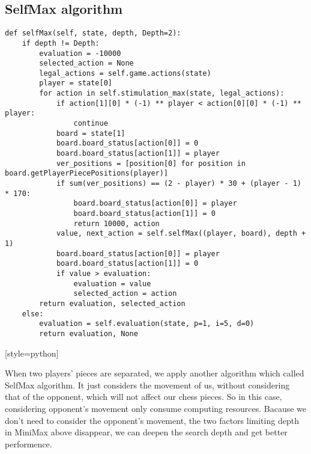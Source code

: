 \documentclass[aps,letterpaper,10pt]{revtex4}
\begin{document}
\subsection{SelfMax algorithm}
\begin{lstlisting}[style=python]
def selfMax(self, state, depth, Depth=2):
	if depth != Depth:
		evaluation = -10000
		selected_action = None
		legal_actions = self.game.actions(state)
		player = state[0]
		for action in self.stimulation_max(state, legal_actions):
			if action[1][0] * (-1) ** player < action[0][0] * (-1) ** player:
				continue
			board = state[1]
			board.board_status[action[0]] = 0
			board.board_status[action[1]] = player
			ver_positions = [position[0] for position in board.getPlayerPiecePositions(player)]
			if sum(ver_positions) == (2 - player) * 30 + (player - 1) * 170:
				board.board_status[action[0]] = player
				board.board_status[action[1]] = 0
				return 10000, action
			value, next_action = self.selfMax((player, board), depth + 1)
			board.board_status[action[0]] = player
			board.board_status[action[1]] = 0
			if value > evaluation:
				evaluation = value
				selected_action = action
		return evaluation, selected_action
	else:
		evaluation = self.evaluation(state, p=1, i=5, d=0)
		return evaluation, None
\end{lstlisting}[style=python]

When two players’ pieces are separated, we apply another algorithm which called SelfMax algorithm.
It just considers the movement of us, without considering that of the opponent, which will not affect our chess pieces.
So in this case, considering opponent's movement only consume computing resources.
Bacause we don't need to consider the opponent's movement, the two factors limiting depth in MiniMax above disappear,
we can deepen the search depth and get better performence.
\end{document}
